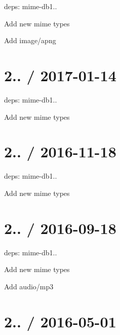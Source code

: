 
\begin{DoxyItemize}
\item deps\+: mime-\/db1..
\begin{DoxyItemize}
\item Add new mime types
\item Add {\ttfamily image/apng}
\end{DoxyItemize}
\end{DoxyItemize}

\section*{2.. / 2017-\/01-\/14 }


\begin{DoxyItemize}
\item deps\+: mime-\/db1..
\begin{DoxyItemize}
\item Add new mime types
\end{DoxyItemize}
\end{DoxyItemize}

\section*{2.. / 2016-\/11-\/18 }


\begin{DoxyItemize}
\item deps\+: mime-\/db1..
\begin{DoxyItemize}
\item Add new mime types
\end{DoxyItemize}
\end{DoxyItemize}

\section*{2.. / 2016-\/09-\/18 }


\begin{DoxyItemize}
\item deps\+: mime-\/db1..
\begin{DoxyItemize}
\item Add new mime types
\item Add {\ttfamily audio/mp3}
\end{DoxyItemize}
\end{DoxyItemize}

\section*{2.. / 2016-\/05-\/01 }


